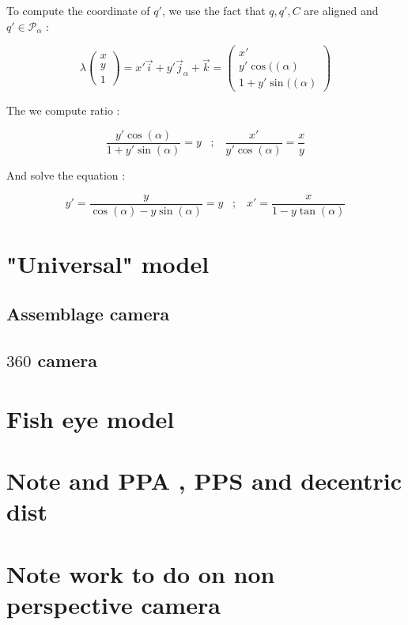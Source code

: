 To compute the coordinate of $q'$, we use the fact that $q,q',C$ are aligned and $q' \in \mathcal{P}_\alpha$ :

\begin{equation}
        \lambda \begin{pmatrix} x \\ y  \\ 1  \end{pmatrix}
      = x'  \vec{i} + y' \vec{j}_\alpha  + \vec{k}
      =	\begin{pmatrix} x' \\ y'\cos((\alpha)  \\ 1+y'\sin((\alpha)  \end{pmatrix}
\end{equation}


The we compute ratio :

\begin{equation}
	\frac{y'\cos(\alpha)}{1+y'\sin(\alpha)} =  y \;\;\; ; \;\;\;  
	\frac{x'}{y'\cos(\alpha)} =  \frac{x}{y} 
\end{equation}

And solve the equation :

\begin{equation}
	y' = \frac{y}{\cos(\alpha) -y \sin(\alpha)} =  y \;\;\; ; \;\;\;
	x' = \frac{x}{1-y \tan(\alpha)}
\end{equation}




\section{"Universal" model}

\subsection{Assemblage camera}
\subsection{$360$ camera}

\section{Fish eye model}
\label{SecFE}

\section{Note and PPA , PPS and decentric dist}
\label{PPA:PPS:DEC}


\section{Note work to do on non perspective camera}








